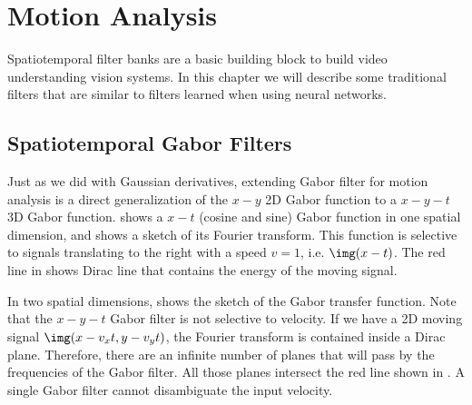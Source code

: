 



%


\section{Motion Analysis}

Spatiotemporal filter banks are a basic building block to build video understanding vision systems. In this chapter we will describe some traditional filters that are similar to filters learned when using neural networks.

\subsection{Spatiotemporal Gabor Filters}




Just as we did with Gaussian derivatives, extending Gabor filter for motion analysis is a direct generalization of the $x-y$ 2D Gabor function to a $x-y-t$ 3D Gabor function.  shows a $x-t$ (cosine and sine) Gabor function in one spatial dimension, and   shows a sketch of its Fourier transform. This function is selective to signals translating to the right with a speed $v=1$, i.e. $\img (x-t)$. The red line in  shows Dirac line that contains the energy of the moving signal.

In two spatial dimensions,  shows the sketch of the Gabor transfer function. Note that the $x-y-t$ Gabor filter is not selective to velocity. If we have a 2D moving signal $\img (x-v_xt, y-v_yt)$, the Fourier transform is contained inside a Dirac plane. Therefore, there are an infinite number of planes that will pass by the frequencies of the Gabor filter. All those planes intersect the red line shown in . A single Gabor filter cannot disambiguate the input velocity.

